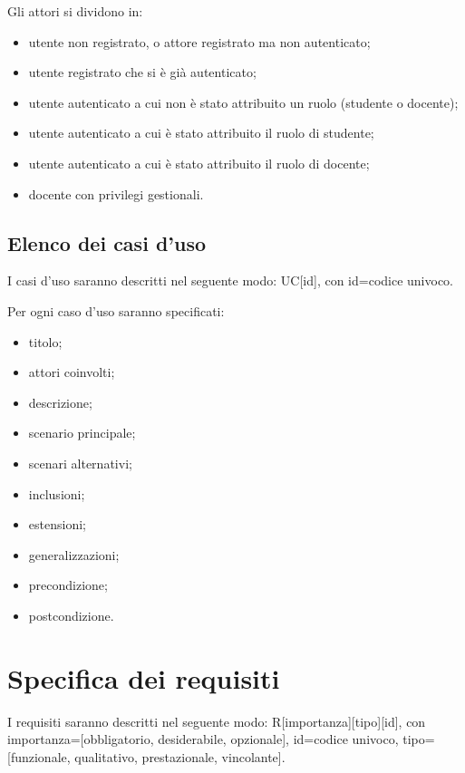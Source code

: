 \documentclass[a4paper, titlepage]{article}
\begin{document}
Gli attori si dividono in:
\begin{itemize}

\item {} utente non registrato, o attore registrato ma non autenticato;
\item {} utente registrato che si è già autenticato;
\item {} utente autenticato a cui non è stato attribuito un ruolo (studente o docente);
\item {} utente autenticato a cui è stato attribuito il ruolo di studente;
\item {} utente autenticato a cui è stato attribuito il ruolo di docente;
\item {} docente con privilegi gestionali.
\end{itemize}

\subsection{Elenco dei casi d'uso}
I casi d'uso saranno descritti nel seguente modo: UC[id], con id=codice univoco. 

Per ogni caso d'uso saranno specificati:
\begin{itemize}
\item titolo;
\item attori coinvolti;
\item descrizione;
\item scenario principale;
\item scenari alternativi;
\item inclusioni;
\item estensioni;
\item generalizzazioni;
\item precondizione;
\item postcondizione.
\end{itemize}

\setcounter{secnumdepth}{0}
\setcounter{tocdepth}{0}



\setcounter{secnumdepth}{5} 
\setcounter{tocdepth}{5} 

\section{Specifica dei requisiti}
I requisiti saranno descritti nel seguente modo: R[importanza][tipo][id], con importanza=[obbligatorio, desiderabile, opzionale], id=codice univoco, tipo=[funzionale, qualitativo, prestazionale, vincolante].
\end{document}
